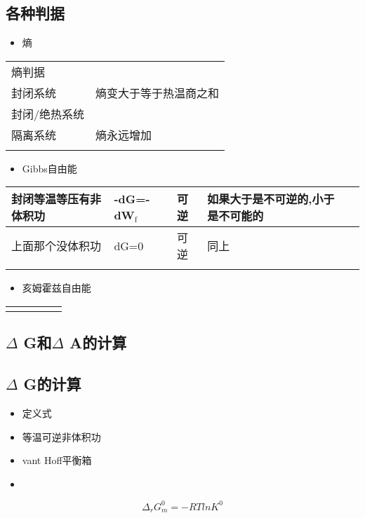 \documentclass[11pt]{article}
\begin{document}
\subsection{各种判据}
\label{sec:org57a3c7d}
\begin{itemize}
\item 熵
\end{itemize}
\begin{center}
\begin{tabular}{ll}
熵判据 & \\
封闭系统 & 熵变大于等于热温商之和\\
封闭/绝热系统 & \\
隔离系统 & 熵永远增加\\
 & \\
\end{tabular}
\end{center}
\begin{itemize}
\item Gibbs自由能
\end{itemize}
\begin{center}
\begin{tabular}{lllll}
封闭等温等压有非体积功 & -dG=-dW\(_{\text{f}}\) & 可逆 & 如果大于是不可逆的,小于是不可能的 & \\
\hline
上面那个没体积功 & dG=0 & 可逆 & 同上 & \\
\hline
 &  &  &  & \\
\end{tabular}
\end{center}
\begin{itemize}
\item 亥姆霍兹自由能
\end{itemize}
\begin{center}
\begin{tabular}{lllll}
 &  &  &  & \\
\hline
 &  &  &  & \\
\end{tabular}
\end{center}
\subsection{\(\Delta\) G和\(\Delta\) A的计算}
\label{sec:org36c0e55}
\subsection{\(\Delta\) G的计算}
\label{sec:org1be6cb6}
\begin{itemize}
\item 定义式
\item 等温可逆非体积功
\item vant Hoff平衡箱
\item 
\end{itemize}
\[
\Delta_r G_m^0 =-RTlnK^0
\]
\end{document}
